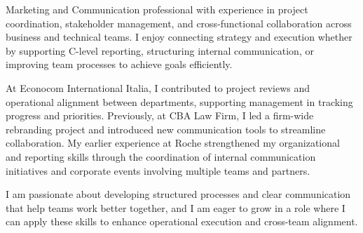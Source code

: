 
\begin{cvparagraph}

Marketing and Communication professional with experience in project coordination, stakeholder management, and cross-functional collaboration across business and technical teams. I enjoy connecting strategy and execution whether by supporting C-level reporting, structuring internal communication, or improving team processes to achieve goals efficiently.

At Econocom International Italia, I contributed to project reviews and operational alignment between departments, supporting management in tracking progress and priorities. Previously, at CBA Law Firm, I led a firm-wide rebranding project and introduced new communication tools to streamline collaboration. My earlier experience at Roche strengthened my organizational and reporting skills through the coordination of internal communication initiatives and corporate events involving multiple teams and partners.

I am passionate about developing structured processes and clear communication that help teams work better together, and I am eager to grow in a role where I can apply these skills to enhance operational execution and cross-team alignment.
\end{cvparagraph}
